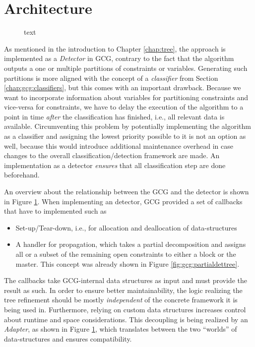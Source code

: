 	\clearpage

	\section{Architecture}
	\label{chap:impl:architecture}

		\begin{figure}[ht!]
			\centering
			
			\caption{text}
			\label{fig:impl:arch:overview}
		\end{figure}

		As mentioned in the introduction to Chapter \ref{chap:tree}, the approach is implemented as a \textit{Detector} in \ac{GCG}, contrary to the fact that the algorithm outputs a one or multiple partitions of constraints or variables.
		Generating such partitions is more aligned with the concept of a \textit{classifier} from Section \ref{chap:gcg:classifiers}, but this comes with an important drawback.
		Because we want to incorporate information about variables for partitioning constraints and vice-versa for constraints, we have to delay the execution of the algorithm to a point in time \textit{after} the classification has finished, i.e., all relevant data is available.
		Circumventing this problem by potentially implementing the algorithm as a classifier and assigning the lowest priority possible to it is not an option as well, because this would introduce additional maintenance overhead in case changes to the overall classification/detection framework are made.
		An implementation as a detector \textit{ensures} that all classification step are done beforehand.

		An overview about the relationship between the \ac{GCG} and the detector is shown in Figure \ref{fig:impl:arch:overview}.
		When implementing an detector, \ac{GCG} provided a set of callbacks that have to implemented such as
		\begin{itemize}
			\item Set-up/Tear-down, i.e., for allocation and deallocation of data-structures
			\item A handler for propagation, which takes a partial decomposition and assigns all or a subset of the remaining open constraints to either a block or the master. This concept was already shown in Figure \ref{fig:gcg:partialdettree}.
		\end{itemize}

		\clearpage

		The callbacks take \ac{GCG}-internal data structures as input and must provide the result as such.
		In order to ensure better maintainability, the logic realizing the tree refinement should be mostly \textit{independent} of the concrete framework it is being used in.
		Furthermore, relying on custom data structures increases control about runtime and space considerations. 
		This decoupling is being realized by an \textit{Adapter}, as shown in Figure \ref{fig:impl:arch:overview}, which translates between the two \enquote{worlds} of data-structures and ensures compatibility.

